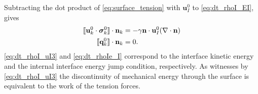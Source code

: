 Subtracting the dot product of \ref{eq:surface_tension} with $\textbf{u}_I^0$ to \ref{eq:dt_rhoI_EI}, gives 
\begin{align}
    \label{eq:dt_rhoI_uI3}
    \llbracket \textbf{u}_k^0 \cdot \bm{\sigma}_k^0 \rrbracket \cdot \textbf{n}_k
    &=
    -\gamma\textbf{n}\cdot \textbf{u}_{I}^0(\mathbf{\nabla}\cdot \textbf{n})\\
    \label{eq:dt_rhoIe_I}
    \llbracket  \textbf{q}_k^0 \rrbracket \cdot \textbf{n}_k
    &= 
     0.
\end{align}
\ref{eq:dt_rhoI_uI3} and \ref{eq:dt_rhoIe_I} correspond to the interface kinetic energy and the internal interface energy jump condition, respectively. 
As witnesses by \ref{eq:dt_rhoI_uI3} the discontinuity of mechanical energy through the surface is equivalent to the work of the tension forces. 
